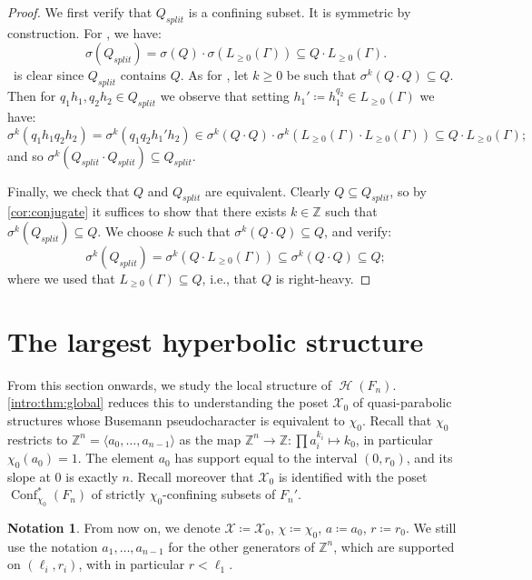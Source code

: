 \documentclass[reqno,12pt]{amsart}\setcounter{tocdepth}{1}
\theoremstyle{definition}
\newtheorem{notation}[theorem]{Notation}
\newcommand{\Z}{\mathbb{Z}}
\DeclareMathOperator{\Hyp}{\mathcal{H}}
\DeclareMathOperator{\Conf}{Conf}
\newcommand{\X}{\mathcal{X}}
\numberwithin{equation}{section}
\begin{document}
\begin{proof}
We first verify that $Q_{split}$ is a confining subset. It is symmetric by construction. For \StayInConf, we have:
\[\sigma(Q_{split}) = \sigma(Q) \cdot \sigma(L_{\geq 0}(\Gamma)) \subseteq Q \cdot L_{\geq 0}(\Gamma).\]
\GetInConf\ is clear since $Q_{split}$ contains $Q$. As for \ProdConf, let $k \geq 0$ be such that $\sigma^k(Q \cdot Q) \subseteq Q$. Then for $q_1 h_1, q_2 h_2 \in Q_{split}$ we observe that setting $h_1' \coloneqq h_1^{q_2} \in L_{\geq 0}(\Gamma)$ we have:
\[\sigma^k(q_1 h_1 q_2 h_2) = \sigma^k(q_1 q_2 h_1' h_2) \in \sigma^k(Q \cdot Q) \cdot \sigma^k(L_{\geq 0}(\Gamma) \cdot L_{\geq 0}(\Gamma)) \subseteq Q\cdot L_{\geq 0}(\Gamma);\]
and so $\sigma^k(Q_{split} \cdot Q_{split}) \subseteq Q_{split}$.

Finally, we check that $Q$ and $Q_{split}$ are equivalent. Clearly $Q \subseteq Q_{split}$, so by \cref{cor:conjugate} it suffices to show that there exists $k \in \Z$ such that $\sigma^k(Q_{split}) \subseteq Q$. We choose $k$ such that $\sigma^k(Q \cdot Q) \subseteq Q$, and verify:
\[\sigma^k(Q_{split}) = \sigma^k(Q \cdot L_{\geq 0}(\Gamma)) \subseteq \sigma^k(Q \cdot Q) \subseteq Q;\]
where we used that $L_{\geq 0}(\Gamma)\subseteq Q$, i.e., that $Q$ is right-heavy.
\end{proof}




\section{The largest hyperbolic structure}\label{sec:largest}

From this section onwards, we study the local structure of $\Hyp(F_n)$. \cref{intro:thm:global} reduces this to understanding the poset $\X_0$ of quasi-parabolic structures whose Busemann pseudocharacter is equivalent to $\chi_0$. Recall that $\chi_0$ restricts to $\Z^n = \langle a_0, \ldots, a_{n-1} \rangle$ as the map $\Z^n \to \Z : \prod a_i^{k_i} \mapsto k_0$, in particular $\chi_0(a_0) = 1$. The element $a_0$ has support equal to the interval $(0, r_0)$, and its slope at $0$ is exactly $n$.
Recall moreover that $\X_0$ is identified with the poset $\Conf^\ast_{\chi_0}(F_n)$ of strictly $\chi_0$-confining subsets of $F_n'$.

\begin{notation}
From now on, we denote $\X \coloneqq \X_0$, $\chi \coloneqq \chi_0$, $a \coloneqq a_0$, $r \coloneqq r_0$.
We still use the notation $a_1, \ldots, a_{n-1}$ for the other generators of $\Z^n$, which are supported on $(\ell_i, r_i)$, with in particular $r < \ell_1$. 
\end{notation}
\end{document}
